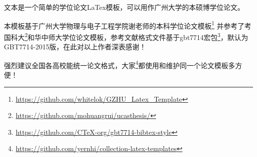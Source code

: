 
文本是一个简单的学位论文LaTex模板，可以用作广州大学的本硕博学位论文。

本模板基于广州大学物理与电子工程学院谢老师的本科学位论文模板\footnote{\url{https://github.com/whitelok/GZHU_Latex_Template}} 并参考了考国科大\footnote{\url{https://github.com/mohuangrui/ucasthesis/}}和华中师大学位论文模板，参考文献格式文件基于gbt7714宏包\footnote{\url{https://github.com/CTeX-org/gbt7714-bibtex-style}}，默认为GBT7714-2015版，在此对以上作者深表感谢！

强烈建议全国各高校能统一论文格式，大家\footnote{\url{https://github.com/yernhi/collection-latex-templates}}都使用和维护同一个论文模板多方便！

